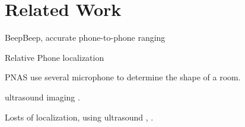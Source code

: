\section{Related Work}
\label{sec:related}

BeepBeep, accurate phone-to-phone ranging\cite{peng2007beepbeep}


Relative Phone localization \cite{qiu2011feasibility} 


PNAS \cite{dokmanic2013acoustic} use several microphone to determine the shape of a room.


ultrasound imaging \cite{}.



Losts of localization, using ultrasound \cite{harter2002anatomy}, \cite{priyantha2000cricket}.